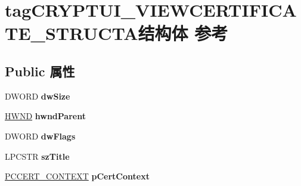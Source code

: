 \hypertarget{structtag_c_r_y_p_t_u_i___v_i_e_w_c_e_r_t_i_f_i_c_a_t_e___s_t_r_u_c_t_a}{}\section{tag\+C\+R\+Y\+P\+T\+U\+I\+\_\+\+V\+I\+E\+W\+C\+E\+R\+T\+I\+F\+I\+C\+A\+T\+E\+\_\+\+S\+T\+R\+U\+C\+T\+A结构体 参考}
\label{structtag_c_r_y_p_t_u_i___v_i_e_w_c_e_r_t_i_f_i_c_a_t_e___s_t_r_u_c_t_a}
\subsection*{Public 属性}
\begin{DoxyCompactItemize}
\item 
\mbox{\label{structtag_c_r_y_p_t_u_i___v_i_e_w_c_e_r_t_i_f_i_c_a_t_e___s_t_r_u_c_t_a_af9bf076ffb1c7566b834884866a07a0b}} 
D\+W\+O\+RD {\bfseries dw\+Size}
\item 
\mbox{\label{structtag_c_r_y_p_t_u_i___v_i_e_w_c_e_r_t_i_f_i_c_a_t_e___s_t_r_u_c_t_a_adbf4ab26ddd90af39d0f36f6e67439a5}} 
\hyperlink{interfacevoid}{H\+W\+ND} {\bfseries hwnd\+Parent}
\item 
\mbox{\label{structtag_c_r_y_p_t_u_i___v_i_e_w_c_e_r_t_i_f_i_c_a_t_e___s_t_r_u_c_t_a_a1a4c8996e1558673eb76641bddc00154}} 
D\+W\+O\+RD {\bfseries dw\+Flags}
\item 
\mbox{\label{structtag_c_r_y_p_t_u_i___v_i_e_w_c_e_r_t_i_f_i_c_a_t_e___s_t_r_u_c_t_a_a9e53bb820f71466ced7e749e5fbed6fd}} 
L\+P\+C\+S\+TR {\bfseries sz\+Title}
\item 
\mbox{\label{structtag_c_r_y_p_t_u_i___v_i_e_w_c_e_r_t_i_f_i_c_a_t_e___s_t_r_u_c_t_a_aa16c87f409e932ec26fc7bcbc3a4e983}} 
\hyperlink{struct___c_e_r_t___c_o_n_t_e_x_t}{P\+C\+C\+E\+R\+T\+\_\+\+C\+O\+N\+T\+E\+XT} {\bfseries p\+Cert\+Context}

\end{DoxyCompactItemize}
